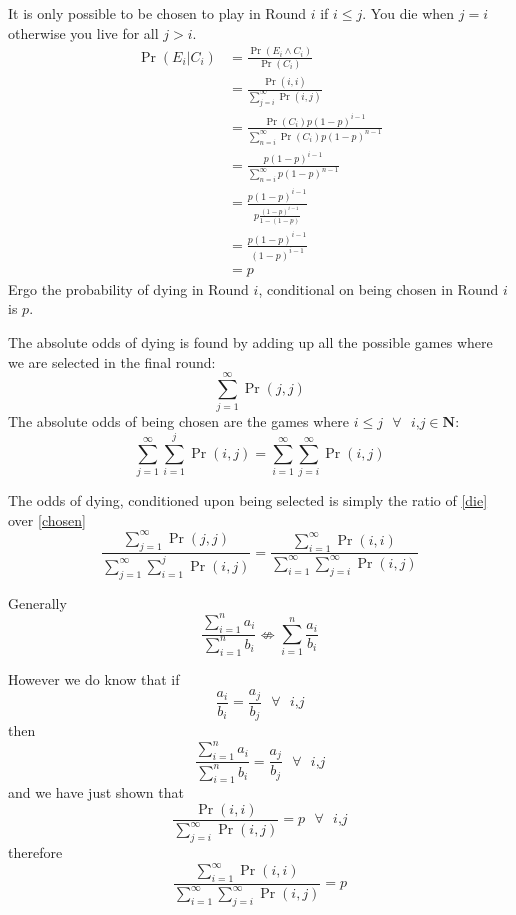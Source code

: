 \documentclass[article,twocolumn]{memoir}
\begin{document}
\begin{itemize}
{        It is only possible to be chosen to play in Round $i$ if $i\leq j$.  You die when $j=i$ otherwise you live for all $j>i$. 
            \begin{align*}
                 \Pr(E_i|C_i)&=\frac{\Pr(E_i\land C_i)}{\Pr(C_i)}\\ 
                 &=\frac{\Pr(i,i)}{\sum_{j=i}^\infty \Pr(i,j)}\\
                 &=\frac{\Pr(C_i)p(1-p)^{i-1}}{\sum_{n=i}^{\infty} \Pr(C_i)p(1-p)^{n-1}}\\
                 &=\frac{p(1-p)^{i-1}}{\sum_{n=i}^{\infty}p(1-p)^{n-1}}\\
                 &=\frac{p(1-p)^{i-1}}{p\frac{(1-p)^{i-1}}{1-(1-p)}}\\
                 &=\frac{p(1-p)^{i-1}}{(1-p)^{i-1}}\\
                 &=p
            \end{align*}
            Ergo the probability of dying in Round $i$, conditional on being chosen in Round $i$ is $p$.

        The absolute odds of dying is found by adding up all the possible games where we are selected in the final round:
        \begin{equation}
          \sum_{j=1}^{\infty} \Pr(j,j) \label{die}
        \end{equation} 
        The absolute odds of being chosen are the games where  $i\leq j \text{ }\forall \text{ } i\text{,}j \in \mathbf{N}$:
        \begin{equation}
          \sum_{j=1}^{\infty} \sum_{i=1}^{j} \Pr(i,j) = \sum_{i=1}^{\infty} \sum_{j=i}^{\infty} \Pr(i,j) \label{chosen} 
        \end{equation}
        
        The odds of dying, conditioned upon being selected is simply the ratio of \ref{die} over \ref{chosen}
        \begin{equation}
          \frac{\sum_{j=1}^{\infty} \Pr(j,j)}{\sum_{j=1}^{\infty} \sum_{i=1}^{j} \Pr(i,j)} = \frac{\sum_{i=1}^{\infty} \Pr(i,i)}{\sum_{i=1}^{\infty} \sum_{j=i}^{\infty} \Pr(i,j)}\label{theAnswer}
        \end{equation}

        Generally 
            $$\frac{\sum_{i=1}^{n} a_i}{\sum_{i=1}^{n} b_i}\nLeftrightarrow \sum_{i=1}^{n} \frac{a_i}{b_i}$$

        However we do know that if 
            $$\frac{a_i}{b_i}=\frac{a_j}{b_j} \text{   } \forall \text{ } i\text{,}j$$
        then
            $$\frac{\sum_{i=1}^{n} a_i}{\sum_{i=1}^{n} b_i} = \frac{a_j}{b_j}\text{   } \forall \text{ } i\text{,}j$$
        and we have just shown that 
            $$\frac{\Pr(i,i)}{\sum_{j=i}^\infty \Pr(i,j)} = p \text{   } \forall \text{ } i\text{,}j$$
        therefore 
            $$\frac{\sum_{i=1}^{\infty} \Pr(i,i)}{\sum_{i=1}^{\infty} \sum_{j=i}^{\infty} \Pr(i,j)}=p$$
    }


\end{itemize}
\end{document}
